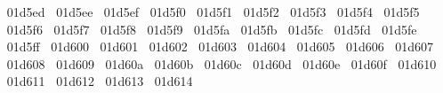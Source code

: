 {  ^^^^^^01d5ed%
  ^^^^^^01d5ee%
  ^^^^^^01d5ef%
  ^^^^^^01d5f0%
  ^^^^^^01d5f1%
  ^^^^^^01d5f2%
  ^^^^^^01d5f3%
  ^^^^^^01d5f4%
  ^^^^^^01d5f5%
  ^^^^^^01d5f6%
  ^^^^^^01d5f7%
  ^^^^^^01d5f8%
  ^^^^^^01d5f9%
  ^^^^^^01d5fa%
  ^^^^^^01d5fb%
  ^^^^^^01d5fc%
  ^^^^^^01d5fd%
  ^^^^^^01d5fe%
  ^^^^^^01d5ff%
  ^^^^^^01d600%
  ^^^^^^01d601%
  ^^^^^^01d602%
  ^^^^^^01d603%
  ^^^^^^01d604%
  ^^^^^^01d605%
  ^^^^^^01d606%
  ^^^^^^01d607%
  ^^^^^^01d608%
  ^^^^^^01d609%
  ^^^^^^01d60a%
  ^^^^^^01d60b%
  ^^^^^^01d60c%
  ^^^^^^01d60d%
  ^^^^^^01d60e%
  ^^^^^^01d60f%
  ^^^^^^01d610%
  ^^^^^^01d611%
  ^^^^^^01d612%
  ^^^^^^01d613%
  ^^^^^^01d614%
}
